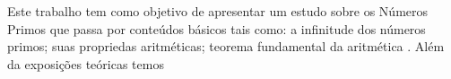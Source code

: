 Este trabalho tem como objetivo de apresentar um estudo sobre os Números Primos que passa por conteúdos básicos tais como: a infinitude dos números primos; suas propriedas aritméticas; teorema fundamental da aritmética . Além da exposições teóricas temos 


